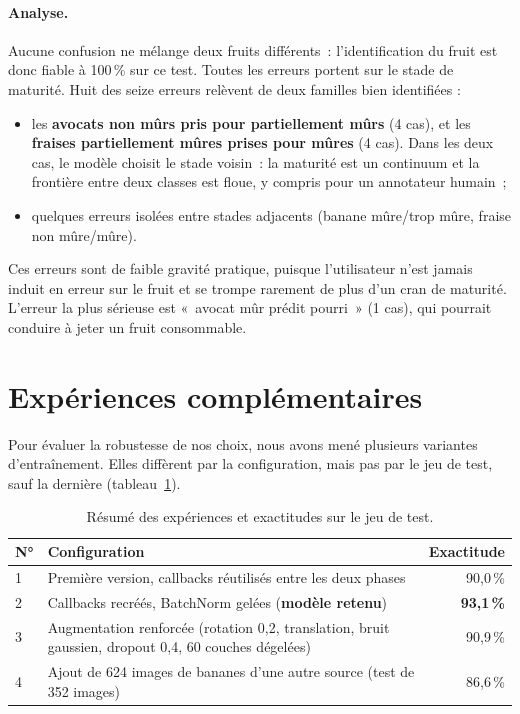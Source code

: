 \paragraph{Analyse.} Aucune confusion ne mélange deux fruits différents~: l’identification du fruit est donc fiable à 100\,\% sur ce test. Toutes les erreurs portent sur le stade de maturité. Huit des seize erreurs relèvent de deux familles bien identifiées :

\begin{itemize}
  \item les \textbf{avocats non mûrs pris pour partiellement mûrs} (4 cas), et les \textbf{fraises partiellement mûres prises pour mûres} (4 cas). Dans les deux cas, le modèle choisit le stade voisin~: la maturité est un continuum et la frontière entre deux classes est floue, y compris pour un annotateur humain~;
  \item quelques erreurs isolées entre stades adjacents (banane mûre/trop mûre, fraise non mûre/mûre).
\end{itemize}

Ces erreurs sont de faible gravité pratique, puisque l’utilisateur n’est jamais induit en erreur sur le fruit et se trompe rarement de plus d’un cran de maturité. L’erreur la plus sérieuse est «~avocat mûr prédit pourri~» (1 cas), qui pourrait conduire à jeter un fruit consommable.

\section{Expériences complémentaires}

Pour évaluer la robustesse de nos choix, nous avons mené plusieurs variantes d’entraînement. Elles diffèrent par la configuration, mais pas par le jeu de test, sauf la dernière (tableau~\ref{tab:exp}).

\begin{table}[H]
\centering
\caption{Résumé des expériences et exactitudes sur le jeu de test.}\label{tab:exp}
\small
\begin{tabularx}{\textwidth}{@{}lXr@{}}
\toprule
\textbf{N°} & \textbf{Configuration} & \textbf{Exactitude} \\
\midrule
1 & Première version, callbacks réutilisés entre les deux phases & 90,0\,\% \\
2 & Callbacks recréés, BatchNorm gelées (\textbf{modèle retenu}) & \textbf{93,1\,\%} \\
3 & Augmentation renforcée (rotation 0,2, translation, bruit gaussien, dropout 0,4, 60 couches dégelées) & 90,9\,\% \\
4 & Ajout de 624 images de bananes d’une autre source (test de 352 images) & 86,6\,\% \\
\bottomrule
\end{tabularx}
\end{table}

